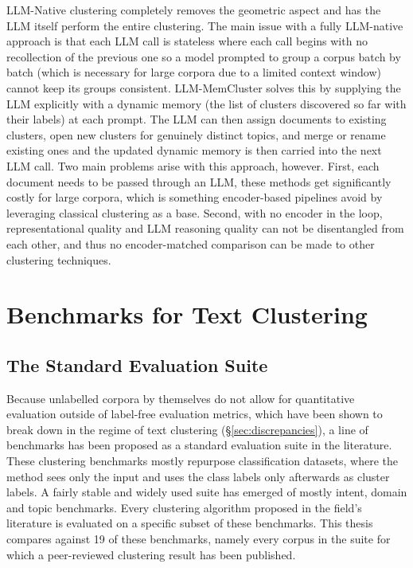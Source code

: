 \documentclass[11pt,a4paper,oneside]{report}
\begin{document}
LLM-Native clustering completely removes the geometric aspect and has the LLM itself perform the entire clustering. The main issue with a fully LLM-native approach is that each LLM call is stateless where each call begins with no recollection of the previous one so a model prompted to group a corpus batch by batch (which is necessary for large corpora due to a limited context window) cannot keep its groups consistent. LLM-MemCluster \citep{zhu2025memcluster} solves this by supplying the LLM explicitly with a dynamic memory (the list of clusters discovered so far with their labels) at each prompt. The LLM can then assign documents to existing clusters, open new clusters for genuinely distinct topics, and merge or rename existing ones and the updated dynamic memory is then carried into the next LLM call. Two main problems arise with this approach, however. First, each document needs to be passed through an LLM, these methods get significantly costly for large corpora, which is something encoder-based pipelines avoid by leveraging classical clustering as a base. Second, with no encoder in the loop, representational quality and LLM reasoning quality can not be disentangled from each other, and thus no encoder-matched comparison can be made to other clustering techniques.

\section{Benchmarks for Text Clustering}\label{sec:benchmarks}

\subsection{The Standard Evaluation Suite}\label{sec:suite}

Because unlabelled corpora by themselves do not allow for quantitative evaluation outside of label-free evaluation metrics, which have been shown to break down in the regime of text clustering (\S\ref{sec:discrepancies}), a line of benchmarks has been proposed as a standard evaluation suite in the literature. These clustering benchmarks mostly repurpose classification datasets, where the method sees only the input and uses the class labels only afterwards as cluster labels. A fairly stable and widely used suite has emerged of mostly intent, domain and topic benchmarks. Every clustering algorithm proposed in the field's literature is evaluated on a specific subset of these benchmarks. This thesis compares against 19 of these benchmarks, namely every corpus in the suite for which a peer-reviewed clustering result has been published.
\end{document}
